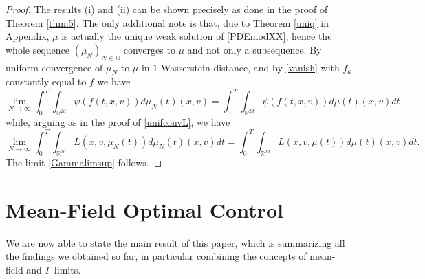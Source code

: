 \documentclass[11pt]{article}
\theoremstyle{plain}
\theoremstyle{definition}
\theoremstyle{remark}
\numberwithin{equation}{section}
\begin{document}
\begin{proof}
The results (i) and (ii) can be shown precisely as done in the proof of Theorem \ref{thm:5}. The only additional note is 
that, due to Theorem \ref{uniq} in Appendix, $\mu$ is actually the unique weak solution of \eqref{PDEmodXX}, hence 
the whole sequence $(\mu_N)_{N \in \mathbb N}$ converges to $\mu$ and not only a subsequence. By uniform convergence of $\mu_N$ to $\mu$ in $1$-Wasserstein distance, and by \eqref{vanish} with $f_k$ constantly equal to $f$ we have
$$
\lim_{N \to \infty} \int_0^T \int_{\mathbb R^{2d}}\psi(f(t,x,v)) d\mu_{N}(t)(x,v) = \int_0^T \int_{\mathbb R^{2d}}  \psi(f(t,x,v)) d\mu(t)(x,v)dt
$$
while, arguing as in the proof of \eqref{unifconvL}, we have
\begin{equation*}
\lim_{N \to \infty} \int_0^T \int_{\mathbb R^{2d}} L(x,v,\mu_N(t)) d\mu_N(t)(x,v)  dt = \int_0^T \int_{\mathbb R^{2d}} L(x,v,\mu(t))d\mu(t)(x,v)  dt.
\end{equation*}
The limit \eqref{Gammalimsup} follows.
\end{proof}

\section{Mean-Field Optimal Control}
We are now able to state the main result of this paper, which is summarizing all the findings we obtained so far, in particular combining the concepts of
mean-field and $\Gamma$-limits.
\end{document}
